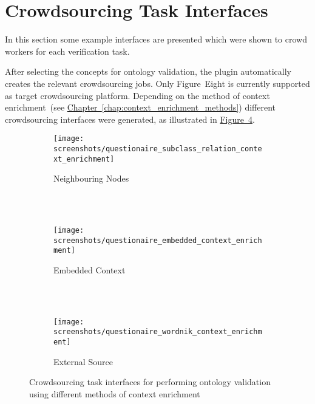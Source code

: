\section{Crowdsourcing Task Interfaces}\label{sec:crowdsourcing_task_interfaces}
In this section some example interfaces are presented which were shown to crowd workers for each verification task. 

After selecting the concepts for ontology validation, the plugin automatically creates the relevant crowdsourcing jobs. Only Figure~Eight is currently supported as target crowdsourcing platform. Depending on the method of context enrichment~(see \hyperref[chap:context_enrichment_methods]{Chapter~\ref*{chap:context_enrichment_methods}}) different crowdsourcing interfaces were generated, as illustrated in \hyperref[fig:all_crowdsourcing_interfaces]{Figure~\ref*{fig:all_crowdsourcing_interfaces}}. 

\begin{figure}
    \centering
    \begin{subfigure}[b]{\textwidth}
        \texttt{[image: screenshots/questionaire\_subclass\_relation\_context\_enrichment]}
        \caption{Neighbouring Nodes}
        \label{fig:crowdsourcing_interface_nn}
    \end{subfigure}
	~\\~\\
    \begin{subfigure}[b]{\textwidth}
        \texttt{[image: screenshots/questionaire\_embedded\_context\_enrichment]}
        \caption{Embedded Context}
        \label{fig:crowdsourcing_interface_ec}
    \end{subfigure}
	~\\~\\
    \begin{subfigure}[b]{\textwidth}
        \texttt{[image: screenshots/questionaire\_wordnik\_context\_enrichment]}
        \caption{External Source}
        \label{fig:crowdsourcing_interface_es}
    \end{subfigure}
    \caption{Crowdsourcing task interfaces for performing ontology validation using different methods of context enrichment}\label{fig:all_crowdsourcing_interfaces}
\end{figure}

